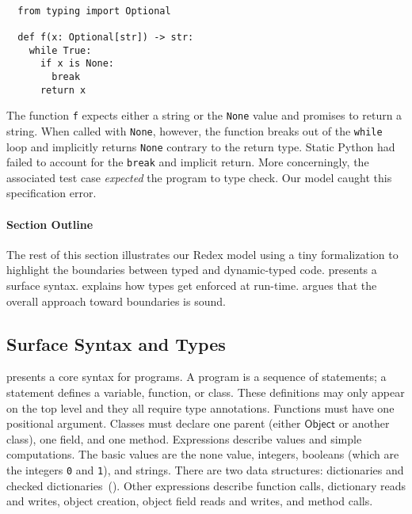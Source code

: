 \documentclass[english,cleveref,crc]{programming}
\newcommand{\SP}{Static Python}
\newcommand{\code}[1]{\texttt{#1}}
\newcommand{\typefont}[1]{\mathsf{#1}}
\newcommand{\sptobject}{\typefont{Object}}
\begin{document}
\medskip
\begin{minipage}[t]{0.25\columnwidth}~
\end{minipage}\begin{minipage}[t]{0.4\columnwidth}
\begin{lstlisting}
  from typing import Optional

  def f(x: Optional[str]) -> str:
    while True:
      if x is None:
        break
      return x
\end{lstlisting}
%
\end{minipage}

\noindent{}The function \code{f} expects either a string or the \code{None} value and promises to return a string.
When called with \code{None}, however, the function breaks out of the \code{while} loop
and implicitly returns \code{None} contrary to the return type.
\SP{} had failed to account for the \code{break} and implicit return.
More concerningly, the associated test case \emph{expected} the program to type check.
Our model caught this specification error.


\paragraph{Section Outline}


The rest of this section illustrates our Redex model using a tiny
formalization to highlight the boundaries between typed and dynamic-typed
code.
 presents a surface syntax.
 explains how types get enforced at run-time.
 argues that the overall approach toward boundaries is sound.


\subsection{Surface Syntax and Types}
\label{s:surface}

 presents a core syntax for programs.
A program is a sequence of statements;
a statement defines a variable, function, or class.
These definitions may only appear on the top level
and they all require type annotations.
Functions must have one positional argument.
Classes must declare one parent (either $\sptobject$ or another class), one field, and one method.
Expressions describe values and simple computations.
The basic values are the none value, integers,
booleans (which are the integers \code{0} and \code{1}), and strings.
There are two data structures: dictionaries and checked dictionaries~().
Other expressions describe function calls, dictionary reads and writes,
object creation, object field reads and writes, and method calls.
\end{document}
